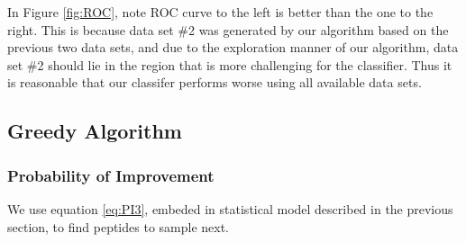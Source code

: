 \documentclass[11pt]{article}
\begin{document}
In Figure \ref{fig:ROC}, note ROC curve to the left is better than the one to the right. This is because data set \#2 was generated by our algorithm based on the previous two data sets, and due to the exploration manner of our algorithm, data set \#2 should lie in the region that is more challenging for the classifier. Thus it is reasonable that our classifer performs worse using all available data sets. 

\subsection{Greedy Algorithm}
\subsubsection{Probability of Improvement}
We use equation \eqref{eq:PI3}, embeded in statistical model described in the previous section, to find peptides to sample next. 
\end{document}
